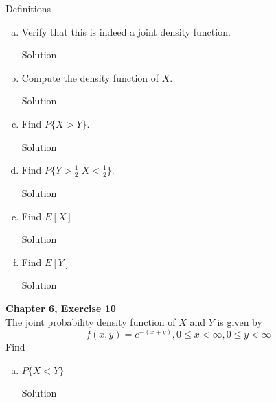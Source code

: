 \documentclass{article}
\begin{document}
\begin{spacing}{1.1}
\begin{homeworkProblem}
  \begin{homeworkSection}{Definitions}

  \end{homeworkSection}
  \begin{enumerate}[(a)]
    \item Verify that this is indeed a joint density function.
      \begin{homeworkSection}{Solution}

      \end{homeworkSection}
    \item Compute the density function of $X$.
      \begin{homeworkSection}{Solution}

      \end{homeworkSection}
    \item Find $P\{ X > Y\}$.
      \begin{homeworkSection}{Solution}

      \end{homeworkSection}
    \item Find $P\{ Y > \frac{ 1}{ 2}| X < \frac{ 1}{ 2}\}$.
      \begin{homeworkSection}{Solution}

      \end{homeworkSection}
    \item Find $E[ X]$
      \begin{homeworkSection}{Solution}

      \end{homeworkSection}
    \item Find $E[ Y]$
      \begin{homeworkSection}{Solution}

      \end{homeworkSection}
  \end{enumerate}
\end{homeworkProblem}

\newpage
\begin{homeworkProblem}
  {\bf Chapter 6, Exercise 10}\\
  The joint probability density function of $X$ and $Y$ is given by
    \[f( x, y) = e^{-(x + y)}, 0 \le x < \infty, 0 \le y < \infty\]
  Find 
  \begin{enumerate}[(a)]
    \item $P\{ X < Y\}$
      \begin{homeworkSection}{Solution}
        

\end{homeworkSection}
\end{enumerate}
\end{homeworkProblem}
\end{spacing}
\end{document}
